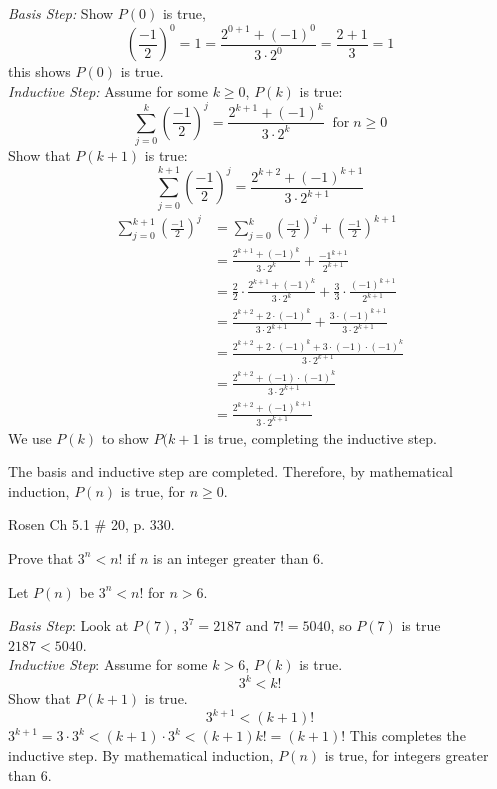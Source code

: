 \documentclass[11pt]{exam}
\begin{document}
\begin{questions}
\begin{solution}
\textit{Basis Step:} Show $P(0)$ is true,
\[ \left( \frac{-1}{2} \right)^0 = 1 = \frac{2^{0+1} + (-1)^0}{3\cdot 2^0} = \frac{2+1}{3} = 1 \]
this shows $P(0)$ is true. \\

\textit{Inductive Step:} Assume for some $k \geq 0$, $P(k)$ is true:
\[ \displaystyle \sum_{j=0}^{k} \left( \frac{-1}{2} \right)^j = \frac{2^{k+1} + (-1)^k}{3\cdot 2^k}\;\; \text{for}\; n \geq 0 \]
Show that $P(k+1)$ is true:
\[ \displaystyle \sum_{j=0}^{k+1} \left( \frac{-1}{2} \right)^j = \frac{2^{k+2} + (-1)^{k+1}}{3\cdot 2^{k+1}} \]
\begin{align*}
    \sum_{j=0}^{k+1} \left( \frac{-1}{2} \right)^j
    & = \sum_{j=0}^{k} \left( \frac{-1}{2} \right)^j + \left( \frac{-1}{2} \right)^{k+1} \tag{def. of summ.} \\
    & = \frac{2^{k+1} + (-1)^k}{3\cdot 2^k} + \frac{-1^{k+1}}{2^{k+1}} \tag{Ind. Hyp.}\\
    & = \frac{2}{2}\cdot\frac{2^{k+1} + (-1)^k}{3\cdot 2^k}
        + \frac{3}{3}\cdot\frac{(-1)^{k+1}}{2^{k+1}} \tag{algebra} \\
    & = \frac{2^{k+2} + 2\cdot(-1)^k}{3\cdot 2^{k+1}}
        + \frac{3\cdot (-1)^{k+1}}{3\cdot 2^{k+1}} \\
    & = \frac{2^{k+2} + 2\cdot(-1)^k + 3\cdot (-1)\cdot (-1)^k}{3\cdot 2^{k+1}} \\
    & = \frac{2^{k+2} + (-1)\cdot (-1)^k}{3\cdot 2^{k+1}} \\
    & = \frac{2^{k+2} + (-1)^{k+1}}{3\cdot 2^{k+1}}
\end{align*}
We use $P(k)$ to show $P(k+1$ is true, completing the inductive step.

The basis and inductive step are completed.  Therefore, by mathematical induction, $P(n)$ is true, for $n \geq 0$.
\end{solution}

\question[10] Rosen Ch 5.1 \# 20, p. 330.
\begin{solution}
Prove that $3^n < n!$ if $n$ is an integer greater than 6.

\smallskip
    Let $P(n)$ be $3^n < n!$ for $n > 6$.

    \textit{Basis Step}: Look at $P(7)$, $3^7 = 2187$ and $7! = 5040$, so $P(7)$ is true $2187 < 5040$. \\

    \textit{Inductive Step}:  Assume for some $k > 6$, $P(k)$ is true.
    \[ 3^k < k! \]
    Show that $P(k+1)$ is true.
    \[ 3^{k+1} < (k+1)! \]
    $3^{k+1} = 3 \cdot 3^{k} < (k+1) \cdot 3^k < (k+1)k! = (k+1)!$
    This completes the inductive step.  By mathematical induction, $P(n)$ is true, for integers greater than 6.
\end{solution}



\end{questions}
\end{document}
